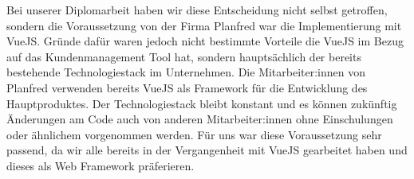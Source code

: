 Bei unserer Diplomarbeit haben wir diese Entscheidung nicht selbst getroffen, sondern die Voraussetzung von der Firma Planfred war die Implementierung mit VueJS. Gr\"unde dafür waren jedoch nicht bestimmte Vorteile die VueJS im Bezug auf das Kundenmanagement Tool hat, sondern hauptsächlich der bereits bestehende Technologiestack im Unternehmen. 
Die Mitarbeiter:innen von Planfred verwenden bereits VueJS als Framework für die Entwicklung des Hauptproduktes.
Der Technologiestack bleibt konstant und es können zukünftig Änderungen am Code auch von anderen Mitarbeiter:innen ohne Einschulungen oder ähnlichem vorgenommen werden.
Für uns war diese Voraussetzung sehr passend, da wir alle bereits in der Vergangenheit mit VueJS gearbeitet haben und dieses als Web Framework präferieren.